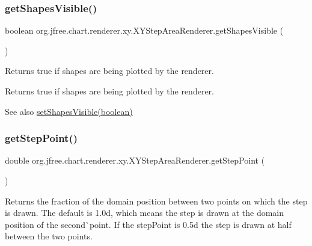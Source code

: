 \subsubsection{\texorpdfstring{get\+Shapes\+Visible()}{getShapesVisible()}}
{\footnotesize\ttfamily boolean org.\+jfree.\+chart.\+renderer.\+xy.\+X\+Y\+Step\+Area\+Renderer.\+get\+Shapes\+Visible (\begin{DoxyParamCaption}{ }\end{DoxyParamCaption})}

Returns true if shapes are being plotted by the renderer.

\begin{DoxyReturn}{Returns}
{\ttfamily true} if shapes are being plotted by the renderer.
\end{DoxyReturn}
\begin{DoxySeeAlso}{See also}
\mbox{\hyperlink{classorg_1_1jfree_1_1chart_1_1renderer_1_1xy_1_1_x_y_step_area_renderer_a4b1baae27007b7c3ce8f0a102ddcafac}{set\+Shapes\+Visible(boolean)}} 
\end{DoxySeeAlso}
\mbox{\label{classorg_1_1jfree_1_1chart_1_1renderer_1_1xy_1_1_x_y_step_area_renderer_adc9f95129691e8ecf98f5d589ed124d2}} 
\subsubsection{\texorpdfstring{get\+Step\+Point()}{getStepPoint()}}
{\footnotesize\ttfamily double org.\+jfree.\+chart.\+renderer.\+xy.\+X\+Y\+Step\+Area\+Renderer.\+get\+Step\+Point (\begin{DoxyParamCaption}{ }\end{DoxyParamCaption})}

Returns the fraction of the domain position between two points on which the step is drawn. The default is 1.\+0d, which means the step is drawn at the domain position of the second\`{}point. If the step\+Point is 0.\+5d the step is drawn at half between the two points.

